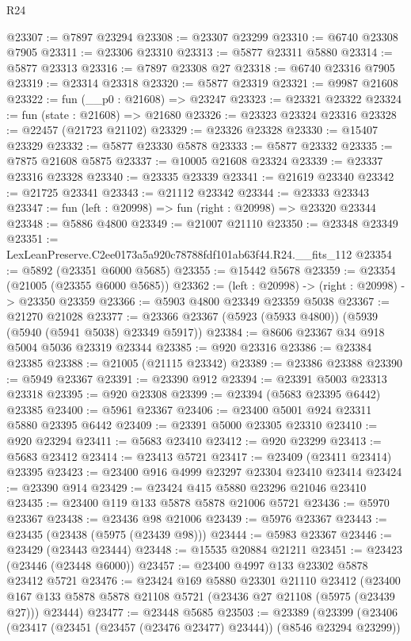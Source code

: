 \begin{lexlean}{R24}
\begin{coremodule}
@23307 := @7897 @23294
@23308 := @23307 @23299
@23310 := @6740 @23308 @7905
@23311 := @23306 @23310
@23313 := @5877 @23311 @5880
@23314 := @5877 @23313
@23316 := @7897 @23308 @27
@23318 := @6740 @23316 @7905
@23319 := @23314 @23318
@23320 := @5877 @23319
@23321 := @9987 @21608
@23322 := fun (__p0 : @21608) => @23247
@23323 := @23321 @23322
@23324 := fun (state : @21608) => @21680
@23326 := @23323 @23324 @23316
@23328 := @22457 (@21723 @21102)
@23329 := @23326 @23328
@23330 := @15407 @23329
@23332 := @5877 @23330 @5878
@23333 := @5877 @23332
@23335 := @7875 @21608 @5875
@23337 := @10005 @21608 @23324
@23339 := @23337 @23316 @23328
@23340 := @23335 @23339
@23341 := @21619 @23340
@23342 := @21725 @23341
@23343 := @21112 @23342
@23344 := @23333 @23343
@23347 := fun (left : @20998) => fun (right : @20998) => @23320 @23344
@23348 := @5886 @4800
@23349 := @21007 @21110
@23350 := @23348 @23349
@23351 := LexLeanPreserve.C2ee0173a5a920c78788fdf101ab63f44.R24.__fits_112
@23354 := @5892 (@23351 @6000 @5685)
@23355 := @15442 @5678
@23359 := @23354 (@21005 (@23355 @6000 @5685))
@23362 := (left : @20998) -> (right : @20998) -> @23350 @23359
@23366 := @5903 @4800 @23349 @23359 @5038
@23367 := @21270 @21028
@23377 := @23366 @23367 (@5923 (@5933 @4800)) (@5939 (@5940 (@5941 @5038) @23349 @5917))
@23384 := @8606 @23367 @34 @918 @5004 @5036 @23319 @23344
@23385 := @920 @23316
@23386 := @23384 @23385
@23388 := @21005 (@21115 @23342)
@23389 := @23386 @23388
@23390 := @5949 @23367
@23391 := @23390 @912
@23394 := @23391 @5003 @23313 @23318
@23395 := @920 @23308
@23399 := @23394 (@5683 @23395 @6442) @23385
@23400 := @5961 @23367
@23406 := @23400 @5001 @924 @23311 @5880 @23395 @6442
@23409 := @23391 @5000 @23305 @23310
@23410 := @920 @23294
@23411 := @5683 @23410
@23412 := @920 @23299
@23413 := @5683 @23412
@23414 := @23413 @5721
@23417 := @23409 (@23411 @23414) @23395
@23423 := @23400 @916 @4999 @23297 @23304 @23410 @23414
@23424 := @23390 @914
@23429 := @23424 @415 @5880 @23296 @21046 @23410
@23435 := @23400 @119 @133 @5878 @5878 @21006 @5721
@23436 := @5970 @23367
@23438 := @23436 @98 @21006
@23439 := @5976 @23367
@23443 := @23435 (@23438 (@5975 (@23439 @98)))
@23444 := @5983 @23367
@23446 := @23429 (@23443 @23444)
@23448 := @15535 @20884 @21211
@23451 := @23423 (@23446 (@23448 @6000))
@23457 := @23400 @4997 @133 @23302 @5878 @23412 @5721
@23476 := @23424
    @169
    @5880
    @23301
    @21110
    @23412
    (@23400 @167 @133 @5878 @5878 @21108 @5721 (@23436 @27 @21108 (@5975 (@23439 @27))) @23444)
@23477 := @23448 @5685
@23503 := @23389
    (@23399
      (@23406
        (@23417 (@23451 (@23457 (@23476 @23477) @23444)) (@8546 @23294 @23299))

\end{coremodule}
\end{lexlean}
